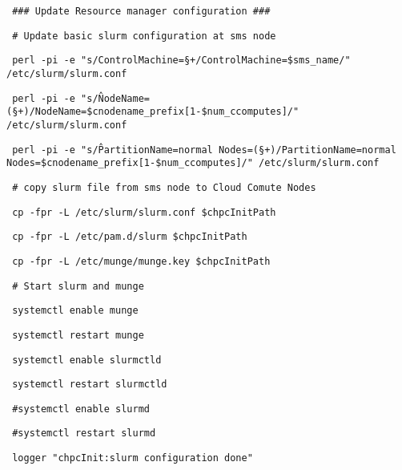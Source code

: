 \begin{section}
\begin{bash}\texttt{\small{ \#\#\# Update Resource manager configuration \#\#\#}}\end{bash}
\begin{bash}\texttt{\small{ \# Update basic slurm configuration at sms node}}\end{bash}
\begin{bash}\texttt{\small{ perl -pi -e "s/ControlMachine=\S+/ControlMachine=\${sms\_name}/" /etc/slurm/slurm.conf}}\end{bash}
\begin{bash}\texttt{\small{ perl -pi -e "s/\^NodeName=(\S+)/NodeName=\${cnodename\_prefix}[1-\${num\_ccomputes}]/" /etc/slurm/slurm.conf}}\end{bash}
\begin{bash}\texttt{\small{ perl -pi -e "s/\^PartitionName=normal Nodes=(\S+)/PartitionName=normal Nodes=\${cnodename\_prefix}[1-\${num\_ccomputes}]/" /etc/slurm/slurm.conf}}\end{bash}
\begin{bash}\texttt{\small{ \# copy slurm file from sms node to Cloud Comute Nodes}}\end{bash}
\begin{bash}\texttt{\small{ cp -fpr -L /etc/slurm/slurm.conf \$chpcInitPath}}\end{bash}
\begin{bash}\texttt{\small{ cp -fpr -L /etc/pam.d/slurm \$chpcInitPath}}\end{bash}
\begin{bash}\texttt{\small{ cp -fpr -L /etc/munge/munge.key \$chpcInitPath}}\end{bash}
\begin{bash}\texttt{\small{ \# Start slurm and munge }}\end{bash}
\begin{bash}\texttt{\small{ systemctl enable munge}}\end{bash}
\begin{bash}\texttt{\small{ systemctl restart munge}}\end{bash}
\begin{bash}\texttt{\small{ systemctl enable slurmctld}}\end{bash}
\begin{bash}\texttt{\small{ systemctl restart slurmctld}}\end{bash}
\begin{bash}\texttt{\small{ \#systemctl enable slurmd}}\end{bash}
\begin{bash}\texttt{\small{ \#systemctl restart slurmd}}\end{bash}
\begin{bash}\texttt{\small{ logger "chpcInit:slurm configuration done"}}\end{bash}


\end{section}
